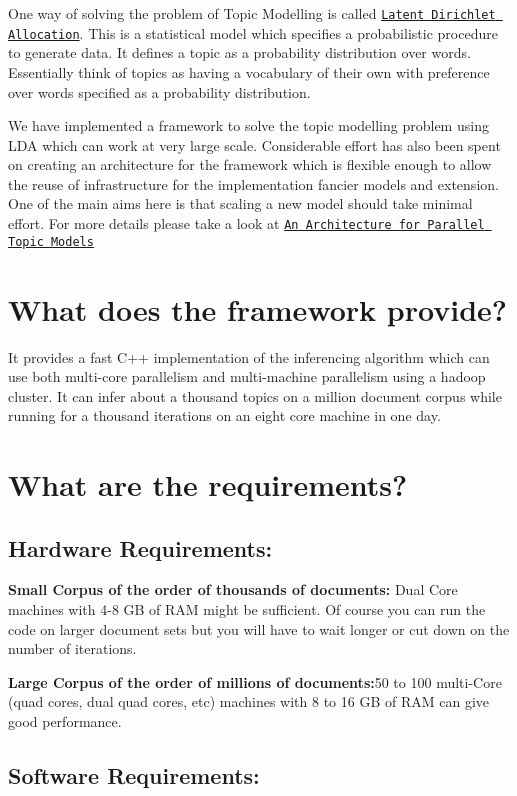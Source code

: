 One way of solving the problem of Topic Modelling is called \href{http://www.cs.princeton.edu/~blei/papers/BleiNgJordan2003.pdf}{\tt Latent Dirichlet Allocation}. This is a statistical model which specifies a probabilistic procedure to generate data. It defines a topic as a probability distribution over words. Essentially think of topics as having a vocabulary of their own with preference over words specified as a probability distribution.

We have implemented a framework to solve the topic modelling problem using LDA which can work at very large scale. Considerable effort has also been spent on creating an architecture for the framework which is flexible enough to allow the reuse of infrastructure for the implementation fancier models and extension. One of the main aims here is that scaling a new model should take minimal effort. For more details please take a look at \href{http://portal.acm.org/citation.cfm?id=1920931}{\tt An Architecture for Parallel Topic Models} 

\par
  \section*{What does the framework provide?}

It provides a fast C++ implementation of the inferencing algorithm which can use both multi-\/core parallelism and multi-\/machine parallelism using a hadoop cluster. It can infer about a thousand topics on a million document corpus while running for a thousand iterations on an eight core machine in one day. 

\par
  \section*{What are the requirements?}

\subsection*{Hardware Requirements:}

{\bfseries Small Corpus of the order of thousands of documents:} Dual Core machines with 4-\/8 GB of RAM might be sufficient. Of course you can run the code on larger document sets but you will have to wait longer or cut down on the number of iterations. 

{\bfseries Large Corpus of the order of millions of documents:}50 to 100 multi-\/Core (quad cores, dual quad cores, etc) machines with 8 to 16 GB of RAM can give good performance. \subsection*{Software Requirements:}

